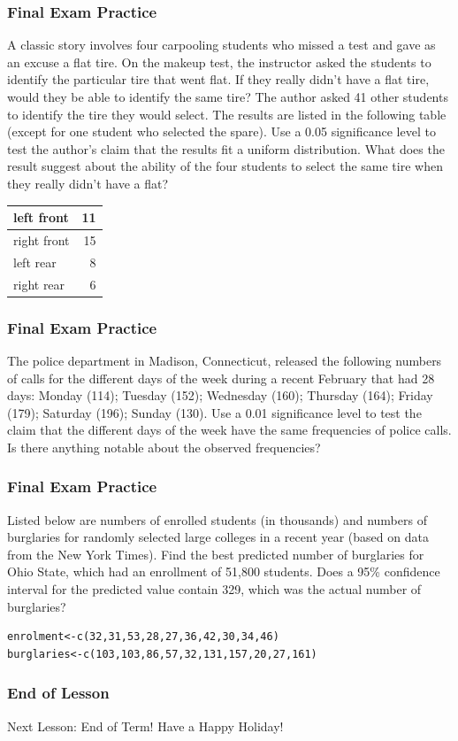 \documentclass[xcolor=dvipsnames]{beamer}
\begin{document}
\begin{frame}
  \frametitle{Final Exam Practice}
  {\ubung} A classic story involves four carpooling students who
  missed a test and gave as an excuse a flat tire. On the makeup test,
  the instructor asked the students to identify the particular tire
  that went flat. If they really didn't have a flat tire, would they
  be able to identify the same tire? The author asked 41 other
  students to identify the tire they would select. The results are
  listed in the following table (except for one student who selected
  the spare). Use a 0.05 significance level to test the author's claim
  that the results fit a uniform distribution. What does the result
  suggest about the ability of the four students to select the same
  tire when they really didn't have a flat?

  \begin{tabular}{|l|r|}\hline
        left front  & 11 \\ \hline
        right front & 15 \\ \hline
        left rear   & 8  \\ \hline
        right rear  & 6  \\ \hline
  \end{tabular}
\end{frame}

\begin{frame}
  \frametitle{Final Exam Practice}
  {\ubung} The police department in Madison, Connecticut, released the
  following numbers of calls for the different days of the week during
  a recent February that had 28 days: Monday (114); Tuesday (152);
  Wednesday (160); Thursday (164); Friday (179); Saturday (196);
  Sunday (130). Use a 0.01 significance level to test the claim that
  the different days of the week have the same frequencies of police
  calls. Is there anything notable about the observed frequencies?
\end{frame}

\begin{frame}[fragile]
  \frametitle{Final Exam Practice}
  {\ubung} Listed below are numbers of enrolled students (in
  thousands) and numbers of burglaries for randomly selected large
  colleges in a recent year (based on data from the New York Times).
  Find the best predicted number of burglaries for Ohio State, which
  had an enrollment of 51,800 students. Does a 95\% confidence
  interval for the predicted value contain 329, which was the actual
  number of burglaries?
\begin{verbatim}
enrolment<-c(32,31,53,28,27,36,42,30,34,46)
burglaries<-c(103,103,86,57,32,131,157,20,27,161)
\end{verbatim}
\end{frame}

\begin{frame}
  \frametitle{End of Lesson}
Next Lesson: End of Term! Have a Happy Holiday!
\end{frame}
\end{document}
